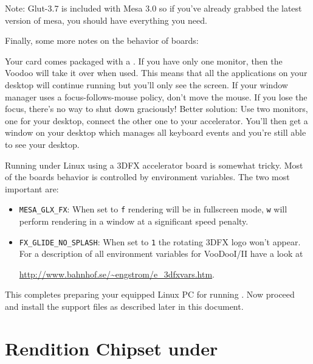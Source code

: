  \noindent
Note: Glut-3.7 is included with Mesa 3.0 so if you've already grabbed
the latest version of mesa, you should have everything you need.

Finally, some more notes on the behavior of  boards:

Your card comes packaged with a . If you
have only one monitor, then the Voodoo will take it over when
used. This means that all the applications on your desktop will
continue running but you'll only see the \FlightGear screen. If
your window manager uses a focus-follows-mouse policy, don't move
the mouse. If you lose the focus, there's no way to shut down
\FlightGear graciously! Better solution: Use two monitors, one for
your desktop, connect the other one to your accelerator. You'll
then get a window on your desktop which manages all keyboard
events and you're still able to see your desktop.

Running \FlightGear under Linux using a 3DFX accelerator board is
somewhat tricky. Most of the boards behavior is controlled by
environment variables. The two most
important are:

\begin{itemize}

\item{\texttt{MESA\_GLX\_FX}}: When set to \texttt{f} rendering will be in
  fullscreen mode,
  \texttt{w} will perform rendering in a window at a significant speed penalty.

\item {\texttt{FX\_GLIDE\_NO\_SPLASH}}:
  When set to \texttt{1} the rotating 3DFX logo
  won't appear. For a description of all environment
  variables for  VooDooI/II have a look at

\href{http://www.bahnhof.se/~engstrom/e_3dfxvars.htm}{http://www.bahnhof.se/\~{}engstrom/e\_3dfxvars.htm}.

\end{itemize}

This completes preparing your  equipped Linux PC for running
\FlightGear\hspace{-1mm}.
Now proceed and install the support files as described later in this document.

\section{Rendition Chipset under
 \label{renditionwin}}

